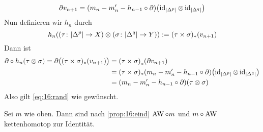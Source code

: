 \begin{beweis}
	\[
		\partial v_{n+1} = \enbrace*{m_n -m_n' - h_{n-1} \circ \partial} \enbrace*{\id_{\abs*{\Delta^p}} \otimes \id_{\abs*{\Delta^q} }}
	\]
	Nun definieren wir $h_n$ durch
	\[
		h_n \enbrace*{\enbrace*{\tau \colon \abs*{\Delta^p} \to X } \otimes  \enbrace*{\sigma \colon \abs*{\Delta^q} \to Y}} := (\tau \times \sigma)_* \enbrace*{v_{n+1}}
	\]
	Dann ist
	\begin{align}
		\partial \circ h_n(\tau \otimes \sigma) = \partial \enbrace[\big]{(\tau \times \sigma)_*(v_{n+1})} &= \enbrace*{\tau \times \sigma}_* \enbrace*{\partial v_{n+1}}\\
		&=(\tau \times \sigma)_* \enbrace*{m_n -m'_n - h_{n-1} \circ \partial}\enbrace*{\id_{\abs*{\Delta^p}} \otimes \id_{\abs*{\Delta^q} }} \\
		&= \enbrace*{m_n - m'_n - h_{n-1} \circ \partial} \enbrace*{\tau \otimes \sigma}
	\end{align}
	Also gilt \eqref{eq:16:rand} wie gewünscht.
\end{beweis}
\begin{beweis}[{name={von Eilenberg-Zilber, \ref{eilenbergzilber}}}]
	Sei $m$ wie oben.
	Dann sind nach \autoref{prop:16:eind} $\operatorname{AW} \circ m$ und $m \circ \operatorname{AW}$ kettenhomotop zur Identität.
\end{beweis}
\newpage

